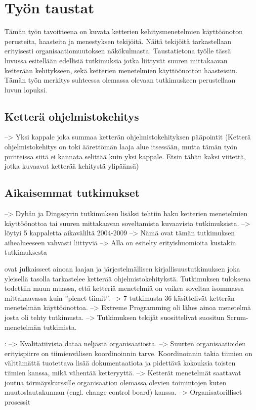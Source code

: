 
\section{Työn taustat}
\label{sec:tausta}

Tämän työn tavoitteena on kuvata ketterien kehitysmenetelmien käyttöönoton
perusteita, haasteita ja menestyksen tekijöitä. Näitä tekijöitä tarkastellaan
erityisesti organisaatiomuutoksen näkökulmasta. Taustatietona työlle tässä
luvussa esitellään edellisiä tutkimuksia jotka liittyvät suuren mittakaavan
ketterään kehitykseen, sekä ketterien menetelmien käyttöönotton haasteisiin.
Tämän työn merkitys suhteessa olemassa olevaan tutkimuskeen perustellaan luvun
lopuksi.

\subsection{Ketterä ohjelmistokehitys}
--> Yksi kappale joka summaa ketterän ohjelmistokehityksen pääpointit
(Ketterä ohjelmistokehitys on toki äärettömän laaja alue itsessään, mutta
tämän työn puitteissa siitä ei kannata selittää kuin yksi kappale. Etsin
tähän kaksi viitettä, jotka kuvaavat ketterää kehitystä ylipäänsä)

\subsection{Aikaisemmat tutkimukset}

--> Dybån ja Dingsøyrin tutkimuksen lisäksi tehtiin haku ketterien menetelmien
käyttöönottoa tai suuren mittakaavan soveltamista kuvaavista tutkimuksista.
--> löytyi 5 kappaletta aikaväliltä 2004-2009
--> Nämä ovat tämän tutkimuksen aihealueeseen vahvasti liittyviä
--> Alla on esitelty erityishuomioita kustakin tutkimuksesta

\cite{Dyba2008} ovat julkaisseet ainoan laajan ja järjestelmällisen
kirjallisuustutkimuksen joka yleisellä tasolla tarkastelee ketterää
ohjelmistokehitykstä. Tutkimuksen tuloksena todettiin muun muassa, että ketteriä
menetelmiä on vaikea soveltaa isommassa mittakaavassa kuin ''pienet tiimit''.
--> 7 tutkimusta 36 käsittelivät ketterän menetelmän käyttöönottoa.
--> Extreme Programming oli lähes ainoa menetelmä josta oli tehty tutkimusta.
--> Tutkimuksen tekijät suosittelivat suositun Scrum-menetelmän tutkimista.
\citep{Dyba2008}

\citep{Lindvall2004}:
--> Kvalitatiivista dataa neljästä organisaatiosta. \newline
--> Suurten organisaatioiden erityispiirre on tiimienvälisen koordinoinnin
tarve. Koordinoinnin takia tiimien on välttämättä tuotettava lisää
dokumentaatiota ja pidettävä kokouksia toisten tiimien kanssa, mikä vähentää
ketteryyttä. \newline
--> Ketterät menetelmät saattavat joutua törmäyskurssille organisaation olemassa
olevien toimintojen kuten muutoslautakunnan (engl. change control board) kanssa. \newline
--> Organisatorilliset prosessit

